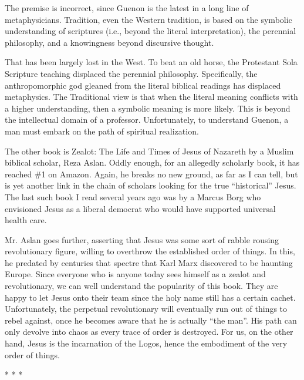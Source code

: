 The premise is incorrect, since Guenon is the latest in a long line of metaphysicians. Tradition, even the Western tradition, is based on the symbolic understanding of scriptures (i.e., beyond the literal interpretation), the perennial philosophy, and a knowingness beyond discursive thought.

That has been largely lost in the West. To beat an old horse, the Protestant Sola Scripture teaching displaced the perennial philosophy. Specifically, the anthropomorphic god gleaned from the literal biblical readings has displaced metaphysics. The Traditional view is that when the literal meaning conflicts with a higher understanding, then a symbolic meaning is more likely. This is beyond the intellectual domain of a professor. Unfortunately, to understand Guenon, a man must embark on the path of spiritual realization.

The other book is Zealot: The Life and Times of Jesus of Nazareth by a Muslim biblical scholar, Reza Aslan. Oddly enough, for an allegedly scholarly book, it has reached \#1 on Amazon. Again, he breaks no new ground, as far as I can tell, but is yet another link in the chain of scholars looking for the true ``historical'' Jesus. The last such book I read several years ago was by a Marcus Borg who envisioned Jesus as a liberal democrat who would have supported universal health care.

Mr. Aslan goes further, asserting that Jesus was some sort of rabble rousing revolutionary figure, willing to overthrow the established order of things. In this, he predated by centuries that spectre that Karl Marx discovered to be haunting Europe. Since everyone who is anyone today sees himself as a zealot and revolutionary, we can well understand the popularity of this book. They are happy to let Jesus onto their team since the holy name still has a certain cachet. Unfortunately, the perpetual revolutionary will eventually run out of things to rebel against, once he becomes aware that he is actually ``the man''. His path can only devolve into chaos as every trace of order is destroyed. For us, on the other hand, Jesus is the incarnation of the Logos, hence the embodiment of the very order of things.



\begin{center}* * *\end{center}

